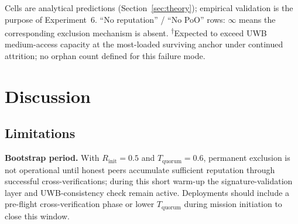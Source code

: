 \documentclass[conference,10pt]{IEEEtran}
\begin{document}
\begin{table}[t]
\centering
\caption{Ablation: expected qualitative outcomes per disabled pillar, derived from the architecture's design intent. Quantitative validation is the purpose of Experiment~6. ``$\infty$'' denotes complete failure of the corresponding capability.}
\label{tab:ablation_expected}
\small
\setlength{\tabcolsep}{3pt}
\vspace{2pt}
{\scriptsize Cells are analytical predictions (Section~\ref{sec:theory}); empirical validation is the purpose of Experiment~6. ``No reputation'' / ``No PoO'' rows: $\infty$ means the corresponding exclusion mechanism is absent. \textsuperscript{$\dagger$}Expected to exceed UWB medium-access capacity at the most-loaded surviving anchor under continued attrition; no orphan count defined for this failure mode.}
\end{table}





\section{Discussion}
\label{sec:discussion}

\subsection{Limitations}

\textbf{Bootstrap period.} With $R_\text{init}{=}0.5$ and $T_\text{quorum}{=}0.6$, permanent exclusion is not operational until honest peers accumulate sufficient reputation through successful cross-verifications; during this short warm-up the signature-validation layer and UWB-consistency check remain active. Deployments should include a pre-flight cross-verification phase or lower $T_\text{quorum}$ during mission initiation to close this window.
\end{document}
